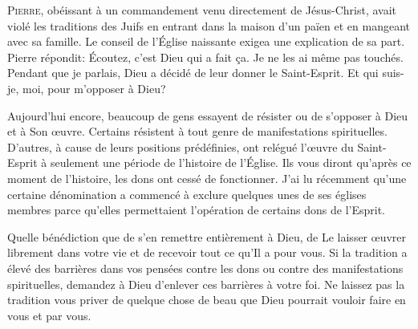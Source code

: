 


\lettrine{P}{ierre}, obéissant à un commandement venu directement
 de Jésus-Christ,
 avait violé les traditions des Juifs en entrant
 dans la maison d'un païen et en mangeant avec sa famille.
 Le conseil de l'Église naissante exigea une explication de sa part.
 Pierre répondit: 
 \Og Écoutez, c'est Dieu qui a fait \c{c}a. Je ne les ai même pas touchés.
 Pendant que je parlais, Dieu a décidé de leur donner le Saint-Esprit.
 Et qui suis-je, moi, pour m'opposer à Dieu? \Fg{}


Aujourd'hui encore, beaucoup de gens essayent de résister ou de s'opposer
 à Dieu et à Son \oe{}uvre. Certains résistent à tout genre de manifestations
 spirituelles. D'autres, à cause de leurs positions prédéfinies,
 ont relégué l'\oe{}uvre du Saint-Esprit à seulement une période
 de l'histoire de l'Église. 
 Ils vous diront qu'après ce moment de l'histoire,
 les dons ont cessé de fonctionner. J'ai lu récemment qu'une certaine
 dénomination a commencé à exclure quelques unes de ses églises membres
 parce qu'elles permettaient l'opération de certains dons de l'Esprit.

Quelle bénédiction que de s'en remettre entièrement à Dieu,
 de Le laisser \oe{}uvrer librement dans votre vie et de recevoir
 tout ce qu'Il a pour vous. Si la tradition a élevé des barrières
 dans vos pensées contre les dons ou contre des manifestations spirituelles,
 demandez à Dieu d'enlever ces barrières à votre foi.
 Ne laissez pas la tradition vous priver de quelque chose de beau
 que Dieu pourrait vouloir faire en vous et par vous.

\dvrule



